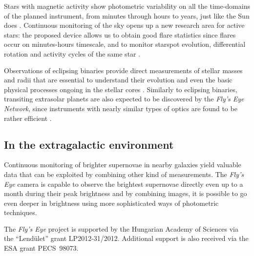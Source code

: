\documentclass[11pt,twoside]{article}
\begin{document}
Stars with magnetic activity show photometric variability on all the
time-domains of the planned instrument, from minutes through hours to
years, just like the Sun does \citep{strassmeier2009}.
Continuous monitoring of the sky opens up a new research area for
active stars: the proposed device allows us to obtain good flare
statistics since flares occur on minutes-hours timescale,
and to monitor starspot evolution, differential rotation 
and activity cycles of the same star
\citep[see e.g.][]{hartman2011,walkowicz2011,olah2009}.

Observations of eclipsing binaries provide direct measurements of
stellar masses and radii that are essential to understand their evolution
and even the basic physical processes ongoing in the stellar cores
\citep{latham2009}. Similarly to eclipsing binaries, transiting 
extrasolar planets are also expected to be discovered by the
{\it Fly's Eye Network}, since instruments with nearly similar types
of optics are found to be rather 
efficient \citep{pollacco2004,bakos2004,pepper2007}.

\subsection{In the extragalactic environment}
Continuous monitoring of brighter supernovae in nearby galaxies
yield valuable data that can be exploited by combining
other kind of measurements. The {\it Fly's Eye} camera is capable to observe
the brightest supernovae directly even up to a month
during their peak brightness \citep[see e.g.][]{vinko2012}
and by combining images, it is possible to go even deeper in brightness
using more sophisticated ways of photometric techniques. 

\acknowledgements 
The {\it Fly's Eye} project is supported by the Hungarian Academy of
Sciences via the ``Lend\"ulet'' grant LP2012-31/2012. Additional support
is also received via the ESA grant PECS~98073.


\end{document}
